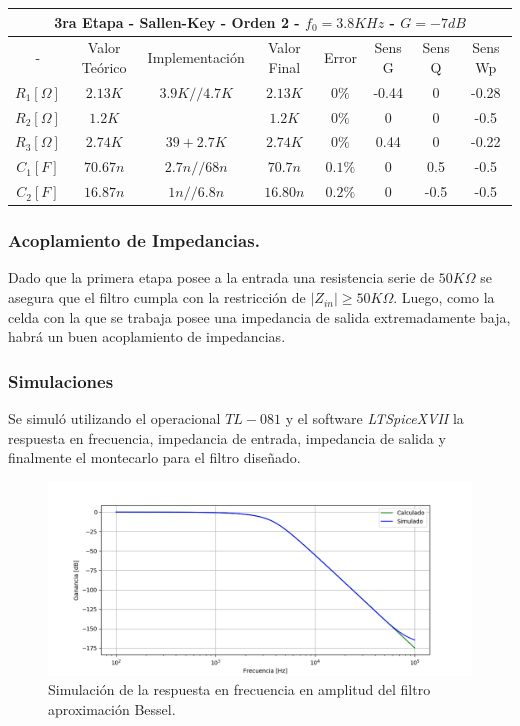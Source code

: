 \begin{table}[H]
\centering
\begin{tabular}{@{}cccccccc@{}}
\multicolumn{8}{c}{3ra Etapa - Sallen-Key - Orden 2 - $f_0 = 3.8KHz$ - $G=-7dB$} \\ \midrule
- & Valor Teórico & Implementación & Valor Final & Error & Sens G & Sens Q & Sens Wp \\ \midrule
$R_1 [\Omega]$ & $2.13K$ & $3.9K//4.7K$ & $2.13K$ & $0\%$ & -0.44 & 0 & -0.28 \\
$R_2 [\Omega]$ & $1.2K$ &  & $1.2K$ & $0\%$ & 0 & 0 & -0.5 \\
$R_3 [\Omega]$ & $2.74K$ & $39+2.7K$ & $2.74K$ & $0\%$ & 0.44 & 0 & -0.22 \\
$C_1 [F]$ & $70.67n$ & $2.7n//68n$ & $70.7n$ & $0.1\%$ & 0 & 0.5 & -0.5 \\
$C_2 [F]$ & $16.87n$ & $1n//6.8n$ & $16.80n$ & $0.2\%$ & 0 & -0.5 & -0.5 \\ \bottomrule
\end{tabular}
\end{table}

\subsubsection{Acoplamiento de Impedancias.}
Dado que la primera etapa posee a la entrada una resistencia serie de $50K\Omega$ se asegura que el filtro cumpla con la restricción de $|Z_{in}| \geq 50K\Omega$. Luego, como la celda con la que se trabaja posee una impedancia de salida extremadamente baja, habrá un buen acoplamiento de impedancias.

\subsubsection{Simulaciones}

Se simuló utilizando el operacional $TL-081$ y el software \textit{LTSpiceXVII} la respuesta en frecuencia, impedancia de entrada, impedancia de salida y finalmente el montecarlo para el filtro diseñado.

\begin{figure}[H]
\centering
	\centering
	\includegraphics[width=\textwidth]{Imagenes-Ej1/bessel_hs_sim.png}
	\caption{Simulación de la respuesta en frecuencia en amplitud del filtro aproximación Bessel.}
	\label{bes_gain_sim}
\end{figure}

